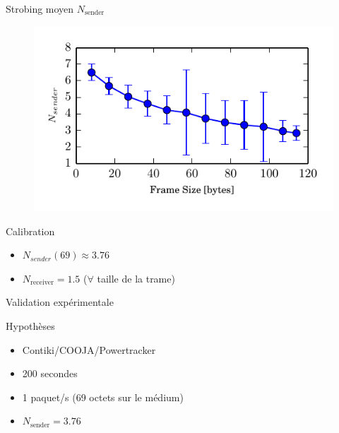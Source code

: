\begin{frame}{Strobing moyen $N_{\textrm{sender}}$}
  \begin{figure}
    \includegraphics[width=.8\textwidth]{figures/average_strobbing.pdf}
  \end{figure}
  \begin{block}{Calibration}
    \begin{itemize}
      \item $N_{sender}(69) \approx 3.76$
      \item $N_{\textrm{receiver}} = 1.5$ ($\forall$ taille de la trame)
    \end{itemize}
  \end{block}
\end{frame}

\begin{frame}{Validation expérimentale}
  \begin{block}{Hypothèses}
    \begin{itemize}
      \item Contiki/COOJA/Powertracker
      \item 200 secondes
      \item 1 paquet/s (69 octets sur le médium)
      \item $N_{\textrm{sender}} = 3.76$
    \end{itemize}
  \end{block}
  \begin{figure}
    \centering
    
  \end{figure}
\end{frame}

